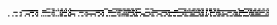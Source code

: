 \documentclass[10pt]{article}
\theoremstyle{plain}
\theoremstyle{definition}
\begin{document}
\begin{table*}[b]
{\begin{minipage}{5.32in}
\[\begin{array}{@{}r@{}}
\begin{array}{@{}l@{}}
\a\a\a\a\a\a\a\a\a\a\a\a\a\a\a\a\a\a\a\a\a\a\a\a\a\a\a\a\a\a\a\a\a\a\a\a \a\a\a\a\b\b\b\b\a\b\b\b\a\a\a\b\a\a\b\b\a\a\b\b\a\a\b\b\a\a\a\a\a\a\a\a \a\a\a\a\a\a\a\a\a\a\a\a\a\a\a\a\a\a\a\a\a\a\a\a\b\b\b\b\a\a\a\a\b\b\b\b \b\b\b\b\b\a\b\b\b\a\b\b\b\a\b\b\b\a\b\b\b\b\b\b\a\a\a\a\b\b\b\b\a\b\b\b \a\a\a\a\a\a\a\a\a\a\a\a\a\a\a\a\a\a\a\a\a\a\a\a\b\b\b\b\b\b\b\b\a\a\b\b \a\a\b\b\b\a\b\b\b\a\b\b\b\a\a\b\b\a\b\b\b\a\b\b\b\a\b\b\a\a\a\a\a\a\a\a \a\a\a\a\a\a\a\a\a\a\b\b\a\a\a\a\b\b\b\b\b\b\b\b\a\a\b\b\a\a\b\b\a\a\b\b \a\a\b\b\mynl
\a\a\a\a\a\a\a\a\a\a\a\a\a\a\a\a\b\b\b\b\b\b\b\b\b\b\b\b\b\b\b\b\a\a\a\a \b\b\b\b\a\a\a\a\a\a\b\b\a\b\a\b\a\b\b\b\a\b\a\b\a\b\a\b\b\b\b\b\b\b\b\b \b\b\b\b\b\b\b\b\b\b\b\b\b\b\b\b\b\b\b\b\b\b\b\b\a\a\a\a\b\b\b\b\a\a\a\a \b\a\b\b\b\b\a\b\b\b\b\b\b\b\a\b\b\b\a\b\a\a\a\a\a\a\a\a\a\a\a\a\a\a\a\b \b\b\b\b\b\b\b\b\b\b\b\b\b\b\b\b\a\a\a\a\b\b\b\b\a\a\a\a\a\a\b\b\a\b\a\b \a\b\b\b\a\b\a\b\b\b\a\b\b\a\a\b\b\a\b\b\b\a\a\b\b\a\b\b\b\b\b\b\b\b\b\b \b\b\b\b\b\b\b\b\a\a\a\b\b\b\b\b\a\a\a\a\b\a\b\b\a\b\b\b\a\b\b\b\a\b\a\b \a\b\a\b\mynl
\a\a\a\a\a\a\a\a\b\b\b\b\a\a\b\b\a\a\a\a\a\a\a\a\b\b\b\b\a\a\b\b\a\a\a\a \b\b\b\b\b\b\b\b\a\b\b\b\a\a\a\a\a\b\a\b\b\b\b\b\a\a\b\b\a\a\a\a\a\a\a\a \b\b\b\b\a\a\b\b\a\a\a\a\a\a\a\a\b\b\b\b\a\a\b\b\a\a\a\a\b\b\b\b\b\b\b\b \a\b\b\b\a\a\a\b\a\b\a\b\b\b\b\b\b\a\b\b\b\b\b\b\a\a\a\a\b\b\b\b\b\a\b\b \b\b\b\b\a\a\a\a\b\b\b\b\b\a\b\b\b\b\b\b\b\b\b\b\b\b\b\b\b\b\b\b\b\b\b\b \b\b\a\b\b\b\b\b\b\a\b\b\b\a\a\b\a\a\a\b\b\b\b\b\a\b\b\b\b\a\a\b\a\a\a\a \b\b\b\b\a\a\b\b\b\b\a\b\b\b\b\b\b\b\b\b\a\b\b\b\b\b\a\b\b\b\a\b\b\b\b\b \a\a\b\b\mynl
\a\a\a\a\a\a\a\a\a\a\a\a\a\a\a\b\a\a\a\a\b\b\b\b\a\a\a\a\a\b\a\b\a\a\a\a \a\a\a\a\a\a\a\a\a\b\a\b\a\a\a\a\a\b\b\b\a\a\a\a\a\b\a\b\b\b\b\b\a\a\a\a \a\a\a\a\a\b\a\b\b\b\b\b\b\b\b\b\a\a\a\a\b\b\a\b\a\a\a\a\a\a\a\a\a\a\a\a \a\b\a\b\a\b\b\b\b\b\b\b\a\a\a\a\b\b\a\b\a\a\a\a\b\b\b\b\a\a\a\a\b\b\a\b \a\a\a\a\b\b\b\b\a\a\a\a\b\b\a\b\a\a\a\a\a\a\a\a\a\a\a\a\b\b\a\b\a\a\a\a \b\b\b\b\a\a\a\a\b\b\a\b\b\a\a\b\a\b\a\b\a\a\a\a\a\b\a\b\b\b\a\b\b\b\b\b \a\a\a\a\a\b\a\b\b\b\a\b\a\a\a\a\a\a\a\a\a\b\a\b\b\b\a\b\b\b\b\b\a\a\a\a \a\b\a\b\mynl
\a\a\a\b\a\a\a\b\a\a\b\b\a\a\b\b\a\a\a\b\a\a\a\b\a\a\b\b\a\a\b\b\a\a\a\b \a\b\a\b\a\b\b\b\a\a\b\b\a\b\a\b\a\b\b\b\a\b\b\b\a\b\b\b\a\a\a\b\a\a\a\b \a\a\b\b\a\a\b\b\a\a\a\b\a\a\a\b\a\a\b\b\a\a\b\b\a\a\b\b\a\b\a\b\b\b\b\b \a\a\b\b\a\b\a\b\a\b\b\b\a\b\b\b\a\b\b\b\b\a\a\b\a\a\b\b\b\b\b\b\a\a\b\b \b\a\a\b\a\a\a\b\b\a\b\b\a\a\b\b\b\b\a\b\b\b\a\b\b\b\b\b\a\a\b\b\b\b\a\b \b\b\b\b\b\b\b\b\a\b\b\b\b\a\b\b\b\a\a\b\b\a\b\b\b\a\b\b\b\a\b\b\b\a\a\b \b\a\b\b\b\a\b\b\b\b\b\b\b\b\a\b\b\b\b\b\b\a\b\b\b\b\b\b\b\b\b\b\b\b\b\b \b\b\b\b\mynl

\end{array}
\end{array}\]
\end{minipage}}
\end{table*}
\end{document}
